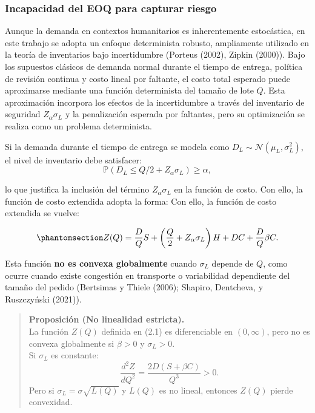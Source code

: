 \documentclass[
  spanish,
  us-letterpaper,
  DIV=11,
  numbers=noendperiod]{scrreprt}
\numberwithin{equation}{section}
\begin{document}
\subsubsection{Incapacidad del EOQ para capturar
riesgo}\label{incapacidad-del-eoq-para-capturar-riesgo}

Aunque la demanda en contextos humanitarios es inherentemente
estocástica, en este trabajo se adopta un enfoque determinista robusto,
ampliamente utilizado en la teoría de inventarios bajo incertidumbre
(Porteus (2002), Zipkin (2000)). Bajo los supuestos clásicos de demanda
normal durante el tiempo de entrega, política de revisión continua y
costo lineal por faltante, el costo total esperado puede aproximarse
mediante una función determinista del tamaño de lote \(Q\). Esta
aproximación incorpora los efectos de la incertidumbre a través del
inventario de seguridad \(Z_\alpha \sigma_L\) y la penalización esperada
por faltantes, pero su optimización se realiza como un problema
determinista.

Si la demanda durante el tiempo de entrega se modela como
\(D_L \sim \mathcal{N}(\mu_L, \sigma_L^2)\), el nivel de inventario debe
satisfacer: \[
\mathbb{P}(D_L \leq Q/2 + Z_\alpha \sigma_L) \geq \alpha,
\]

lo que justifica la inclusión del término \(Z_\alpha \sigma_L\) en la
función de costo. Con ello, la función de costo extendida adopta la
forma: Con ello, la función de costo extendida se vuelve:

\begin{equation}\phantomsection\label{eq-Zux28qux29}{
Z(Q)=\frac{D}{Q}S+\left(\frac{Q}{2}+Z_\alpha\sigma_L\right)H+DC+\frac{D}{Q}\beta C. 
}\end{equation}

Esta función \textbf{no es convexa globalmente} cuando \(\sigma_L\)
depende de \(Q\), como ocurre cuando existe congestión en transporte o
variabilidad dependiente del tamaño del pedido (Bertsimas y Thiele
(2006); Shapiro, Dentcheva, y Ruszczyński (2021)).

\begin{quote}
\textbf{Proposición (No linealidad estricta).}\\
La función \(Z(Q)\) definida en (2.1) es diferenciable en
\((0,\infty)\), pero no es convexa globalmente si \(\beta>0\) y
\(\sigma_L>0\).\\
Si \(\sigma_L\) es constante: \[
\frac{d^2 Z}{dQ^2}=\frac{2D(S+\beta C)}{Q^3}>0.
\] Pero si \(\sigma_L=\sigma\sqrt{L(Q)}\) y \(L(Q)\) es no lineal,
entonces \(Z(Q)\) pierde convexidad.
\end{quote}
\end{document}
